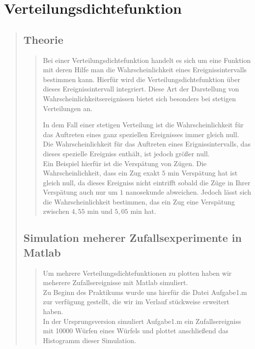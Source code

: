 \section{Verteilungsdichtefunktion}
\begin{quote}
	
	\subsection{Theorie}
    \begin{quote}
        Bei einer Verteilungsdichtefunktion handelt es sich um eine Funktion mit deren Hilfe man die Wahrscheinlichkeit
        eines Ereignissintervalls bestimmen kann. Hierfür wird die Verteilungsdichtefunktion über dieses
        Ereignissintervall integriert. Diese Art der Darstellung von Wahrscheinlichkeitsereignissen bietet sich
        besonders bei stetigen Verteilungen an.\vspace{1em}
        
        In dem Fall einer stetigen Verteilung ist die Wahrscheinlichkeit für das Auftreten eines ganz speziellen
        Ereignisses immer gleich null. Die Wahrscheinlichkeit für das Auftreten eines Erignissintervalls, das dieses
        spezielle Ereigniss enthält, ist jedoch größer null.\\
        Ein Beispiel hierfür ist die Verspätung von Zügen. Die Wahrscheinlichkeit, dass ein Zug exakt $5$ min Verspätung
        hat ist gleich null, da dieses Ereigniss nicht eintrifft sobald die Züge in Ihrer Verspätung auch nur um $1$
        nanosekunde abweichen. Jedoch lässt sich die Wahrscheinlichkeit bestimmen, das ein Zug eine Verspätung zwischen
        $4,55$ min und $5,05$ min hat.\vspace{1em}
        
    \end{quote}
	
	\subsection{Simulation meherer Zufallsexperimente in Matlab}
    \begin{quote}
        Um mehrere Verteilungsdichtefunktionen zu plotten haben wir meherere Zufallsereignisse mit Matlab simuliert.\\
        Zu Beginn des Praktikums wurde uns hierfür die Datei Aufgabe1.m zur verfügung gestellt, die wir im Verlauf
        stückweise erweitert haben.\\
        In der Ursprungsversion simuliert Aufgabe1.m ein Zufallsereigniss mit 10000 Würfen eines Würfels und plottet
        anschließend das Histogramm dieser Simulation.\\

\end{quote}
\end{quote}

